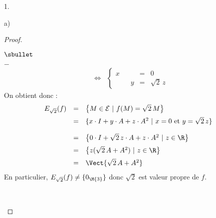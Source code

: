 \documentclass[11pt]{article}%
\begin{document}
\begin{noliste}{1.}
\begin{noliste}{a)}
\begin{proof}
\begin{noliste}{$\sbullet$}
\begin{noliste}{$-$}
\[\begin{array}{rcl}
      & \Longleftrightarrow & \left\{
      \begin{array}{rrrcl}
       x & & & = & 0\\
       & & y & = & \sqrt{2} \, z
      \end{array}
      \right.
     \end{array}
    \]
    On obtient donc :
    \[
     \begin{array}{rcl}
      E_{\sqrt{2}}(f) & = & \left\{ M\in\mathcal{E} \ | \ f(M)= 
      \sqrt{2}\, M \right\}
      \\[.2cm]
      & = & \{ x \cdot I+y \cdot A+z \cdot A^2 \ | \
       x = 0 \mbox{ et }
       y = \sqrt{2} \, z
      \}
      \\[.4cm]
      & = & \left\{ 0\cdot I + \sqrt{2} \, z \cdot A + z \cdot A^2 
      \ | \ z\in\R\right\}
      \\[.2cm]
      & = & \left\{ z(\sqrt{2} \, A + A^2) 
      \ | \ z\in\R\right\}
      \\[.2cm]
      & = & \Vect{\sqrt{2} \, A+A^2}
     \end{array}
    \]
    En particulier, $E_{\sqrt{2}}(f)\neq \{0_{\M{3}}\}$ donc $\sqrt{2}$ 
    est valeur propre de $f$.
    \end{noliste}
          
          
    ~\\[-1cm]
    

\end{noliste}
\end{proof}
\end{noliste}
\end{noliste}
\end{document}
